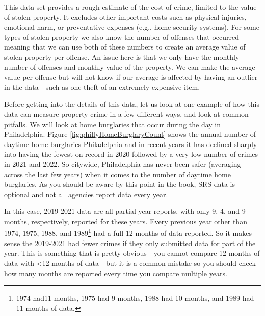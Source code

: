 \documentclass[
]{krantz}
\begin{document}
This data set provides a rough estimate of the cost of crime,
limited to the value of stolen property. It excludes other
important costs such as physical injuries, emotional harm,
or preventative expenses (e.g., home security systems). For
some types of stolen property we also know the number of
offenses that occurred meaning that we can use both of these
numbers to create an average value of stolen property per
offense. An issue here is that we only have the monthly
number of offenses and monthly value of the property. We can
make the average value per offense but will not know if our
average is affected by having an outlier in the data - such
as one theft of an extremely expensive item.

Before getting into the details of this data, let us look at
one example of how this data can measure property crime in a
few different ways, and look at common pitfalls. We will
look at home burglaries that occur during the day in
Philadelphia. Figure \ref{fig:phillyHomeBurglaryCount} shows
the annual number of daytime home burglaries Philadelphia
and in recent years it has declined sharply into having the
fewest on record in 2020 followed by a very low number of
crimes in 2021 and 2022. So citywide, Philadelphia has never
been safer (averaging across the last few years) when it
comes to the number of daytime home burglaries. As you
should be aware by this point in the book, SRS data is
optional and not all agencies report data every year.

In this case, 2019-2021 data are all partial-year reports,
with only 9, 4, and 9 months, respectively, reported for
these years. Every previous year other than 1974, 1975,
1988, and 1989\footnote{1974 had11 months, 1975 had 9
  months, 1988 had 10 months, and 1989 had 11 months of
  data.} had a full 12-months of data reported. So it makes
sense the 2019-2021 had fewer crimes if they only submitted
data for part of the year. This is something that is pretty
obvious - you cannot compare 12 months of data with
\textless12 months of data - but it is a common mistake so
you should check how many months are reported every time you
compare multiple years.
\end{document}
